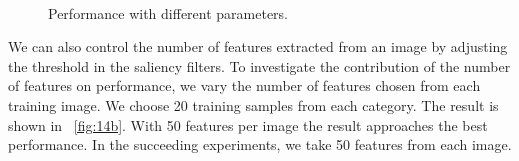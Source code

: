 \documentclass[twocolumn]{article}
\begin{document}
\begin{figure}[!t]
\centering
  \\
\caption{Performance with different parameters.}
\label{fig:14}
\end{figure}

We can also control the number of features extracted from an image by adjusting the threshold in the saliency filters. 
To investigate the contribution of the number of features on performance, we vary the number of features chosen from each training image.
We choose 20 training samples from each category.
The result is shown in \figurename~\ref{fig:14b}.
With 50 features per image the result approaches the best performance.
In the succeeding experiments, we take 50 features from each image.
\end{document}

